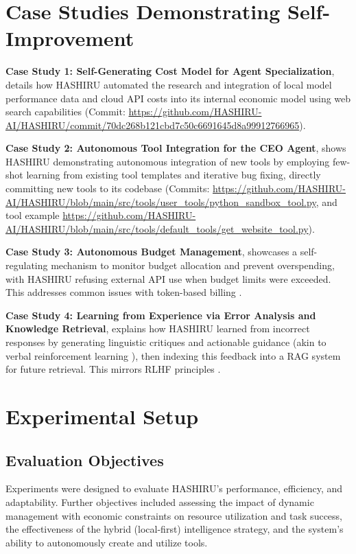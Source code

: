 \documentclass[twocolumn]{article}
\begin{document}
\section{Case Studies Demonstrating Self-Improvement}
\textbf{Case Study 1: Self-Generating Cost Model for Agent Specialization}, details how HASHIRU automated the research and integration of local model performance data and cloud API costs into its internal economic model using web search capabilities (Commit: \url{https://github.com/HASHIRU-AI/HASHIRU/commit/70dc268b121cbd7c50c6691645d8a99912766965}).

\noindent\textbf{Case Study 2: Autonomous Tool Integration for the CEO Agent}, shows HASHIRU demonstrating autonomous integration of new tools by employing few-shot learning from existing tool templates and iterative bug fixing, directly committing new tools to its codebase (Commits: \url{https://github.com/HASHIRU-AI/HASHIRU/blob/main/src/tools/user_tools/python_sandbox_tool.py}, and tool example \url{https://github.com/HASHIRU-AI/HASHIRU/blob/main/src/tools/default_tools/get_website_tool.py}).

\noindent\textbf{Case Study 3: Autonomous Budget Management}, showcases a self-regulating mechanism to monitor budget allocation and prevent overspending, with HASHIRU refusing external API use when budget limits were exceeded. This addresses common issues with token-based billing \cite{gemini_reddit, openai_sos, openai_costs}.

\noindent\textbf{Case Study 4: Learning from Experience via Error Analysis and Knowledge Retrieval}, explains how HASHIRU learned from incorrect responses by generating linguistic critiques and actionable guidance (akin to verbal reinforcement learning \cite{shinn2023reflexion}), then indexing this feedback into a RAG system \cite{lewis2021retrievalaugmentedgenerationknowledgeintensivenlp} for future retrieval. This mirrors RLHF principles \cite{ziegler2019fine, ouyang2022training}.

\section{Experimental Setup}

\subsection{Evaluation Objectives}
Experiments were designed to evaluate HASHIRU's performance, efficiency, and adaptability. Further objectives included assessing the impact of dynamic management with economic constraints on resource utilization and task success, the effectiveness of the hybrid (local-first) intelligence strategy, and the system's ability to autonomously create and utilize tools.
\end{document}
